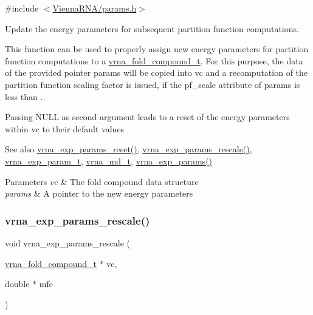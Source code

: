 {\ttfamily \#include $<$\hyperlink{params_8h}{Vienna\+R\+N\+A/params.\+h}$>$}



Update the energy parameters for subsequent partition function computations. 

This function can be used to properly assign new energy parameters for partition function computations to a \hyperlink{group__fold__compound_ga1b0cef17fd40466cef5968eaeeff6166}{vrna\+\_\+fold\+\_\+compound\+\_\+t}. For this purpose, the data of the provided pointer {\ttfamily params} will be copied into {\ttfamily vc} and a recomputation of the partition function scaling factor is issued, if the {\ttfamily pf\+\_\+scale} attribute of {\ttfamily params} is less than {.}.

Passing N\+U\+LL as second argument leads to a reset of the energy parameters within vc to their default values

\begin{DoxySeeAlso}{See also}
\hyperlink{group__energy__parameters_gaa5409218068be84d7b50c78fbdaa85a9}{vrna\+\_\+exp\+\_\+params\+\_\+reset()}, \hyperlink{group__energy__parameters_gad607bc3a5b5da16400e2ca4ea5560233}{vrna\+\_\+exp\+\_\+params\+\_\+rescale()}, \hyperlink{group__energy__parameters_ga01d8b92fe734df8d79a6169482c7d8d8}{vrna\+\_\+exp\+\_\+param\+\_\+t}, \hyperlink{group__model__details_ga1f8a10e12a0a1915f2a4eff0b28ea17c}{vrna\+\_\+md\+\_\+t}, \hyperlink{group__energy__parameters_gab1f3016f96aa96bff020cdd904605afa}{vrna\+\_\+exp\+\_\+params()}
\end{DoxySeeAlso}

\begin{DoxyParams}{Parameters}
{\em vc} & The fold compound data structure \\
\hline
{\em params} & A pointer to the new energy parameters \\
\hline
\end{DoxyParams}
\mbox{\label{group__energy__parameters_gad607bc3a5b5da16400e2ca4ea5560233}} 
\subsubsection{\texorpdfstring{vrna\+\_\+exp\+\_\+params\+\_\+rescale()}{vrna\_exp\_params\_rescale()}}
{\footnotesize\ttfamily void vrna\+\_\+exp\+\_\+params\+\_\+rescale (\begin{DoxyParamCaption}\item[{\hyperlink{group__fold__compound_ga1b0cef17fd40466cef5968eaeeff6166}{vrna\+\_\+fold\+\_\+compound\+\_\+t} $\ast$}]{vc,  }\item[{double $\ast$}]{mfe }\end{DoxyParamCaption})}



